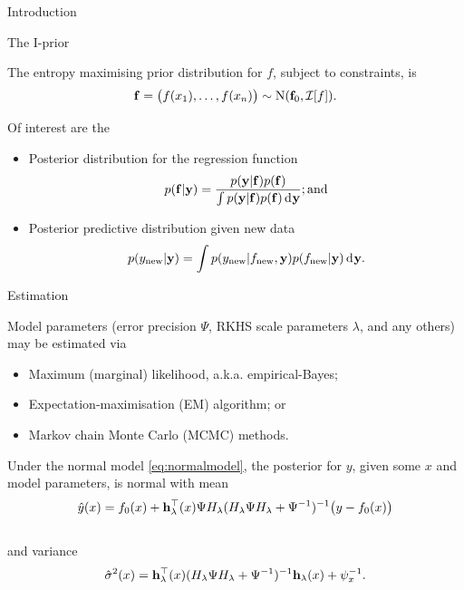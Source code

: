 \documentclass{beamer}
\newlength{\onecolwid}
\begin{document}
\begin{frame}[t]
\begin{columns}[t]
\begin{column}{\onecolwid}
\begin{block}{Introduction}
\begin{alertblock}{The I-prior}

The entropy maximising prior distribution for $f$, subject to constraints, is 
\[
  {\mathbf f} = \big(f(x_1),\dots,f(x_n) \big) \sim \operatorname{N} ({\mathbf f}_0, {\mathcal I}[f]).
\]

\vspace{10pt}

\end{alertblock}

\vspace{-10pt}
Of interest are the

\newcommand{\new}{{\text{new}}}
\begin{itemize}
  \item Posterior distribution for the regression function
  \[
    p({\mathbf f}|{\mathbf y}) = \frac{p({\mathbf y}|{\mathbf f}) p({\mathbf f})}{\int p({\mathbf y}|{\mathbf f}) p({\mathbf f}) \operatorname{d\!\:\!} {\mathbf y}}; \text{and}
  \]
  \item Posterior predictive distribution given new data
  \[
    p(y_\new|\by) = \int p(y_\new|f_\new,\by) p(f_\new|\by) \d \by.
  \]
\end{itemize}

\end{block}



\vspace{-20pt}
\begin{block}{Estimation}

Model parameters (error precision $\Psi$, RKHS scale parameters $\lambda$, and any others) may be estimated via

\begin{itemize}
  \item Maximum (marginal) likelihood, a.k.a. empirical-Bayes;
  \item Expectation-maximisation (EM) algorithm; or
  \item Markov chain Monte Carlo (MCMC) methods.
\end{itemize} 

Under the normal model \eqref{eq:normalmodel}, the posterior for $y$, given some $x$ and model parameters, is normal with mean
~\\[-20pt]
\[
  \hat y(x) = f_0(x) + {\mathbf h}_\lambda^\top(x) \Psi H_\lambda(H_\lambda \Psi H_\lambda + \Psi^{-1})^{-1}\big(y - f_0(x)\big)
\]
~\\[-20pt]
and variance
~\\[-20pt]
\[
  \hat\sigma^2(x) = {\mathbf h}_\lambda^\top(x) (H_\lambda \Psi H_\lambda + \Psi^{-1})^{-1} {\mathbf h}_\lambda(x) + \psi_x^{-1}.
\]


\end{block}
\end{column}
\end{columns}
\end{frame}
\end{document}
